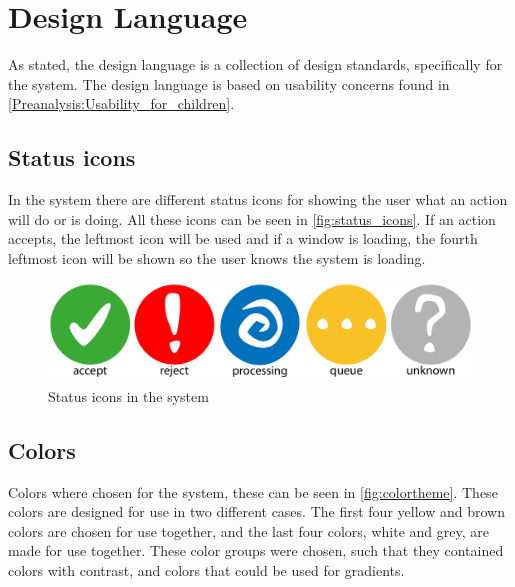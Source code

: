 \section{Design Language}
\label{design:design_language}
As stated, the design language is a collection of design standards, specifically for the \giraf[] system. 
The design language is based on usability concerns found in \autoref{Preanalysis:Usability_for_children}.

\subsection{Status icons}
\label{design:state_icons}

In the \giraf[] system there are different status icons for showing the user what an action will do or is doing. All these icons can be seen in \autoref{fig:status_icons}. If an action accepts, the leftmost icon will be used and if a window is loading, the fourth leftmost icon will be shown so the user knows the system is loading.

\begin{figure}[h!]
	\centering
	\includegraphics[width=\textwidth]{gfx/status_icons}
	\caption{Status icons in the \giraf[] system}
	\label{fig:status_icons}
\end{figure}

\subsection{Colors}
\label{design:giraf_colors}

Colors where chosen for the \giraf[] system, these can be seen in \autoref{fig:colortheme}. These colors are designed for use in two different cases. The first four yellow and brown colors are chosen for use together, and the last four colors, white and grey, are made for use together. 
These color groups were chosen, such that they contained colors with contrast, and colors that could be used for gradients.

